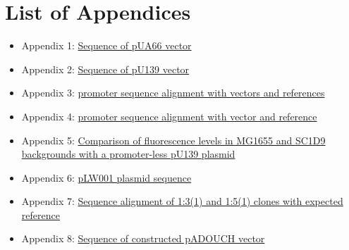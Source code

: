 \chapter*{List of Appendices}

\begin{itemize}[label={}]
\item Appendix 1: \hypertarget{pUA66seq}{\href{https://drive.google.com/open?id=1oHOr45i53oj1ZvaJO2rwhhKW336-1qDa}{Sequence of pUA66 vector}}
\item Appendix 2: \hypertarget{p139seq}{\href{https://drive.google.com/open?id=1eTZO0u8nTtbIphnsHlNvB4G_L2-LnJ-f}{Sequence of pU139 vector}}
\item Appendix 3: \hypertarget{placZalign}{\href{https://drive.google.com/open?id=1uxseqbHVccpsxmKUuVl5_nBY2wEvpF8J}{ promoter sequence alignment with vectors and references}}
\item Appendix 4: \hypertarget{precAalign}{\href{https://drive.google.com/open?id=1g5AUZ4vEhNVGWuKy9A7augQ2beI5EW9o}{ promoter sequence alignment with vector and reference}}
\item Appendix 5: \hypertarget{FCnegs}{\href{https://drive.google.com/open?id=1M2mKz7TUkuwOr1n_dIoUlk9kRn0nOF99}{Comparison of fluorescence levels in MG1655 and SC1\textunderscore D9 backgrounds with a promoter-less pU139 plasmid}}
\item Appendix 6: \hypertarget{pLW001}{\href{https://drive.google.com/open?id=1HhTVjaBZxkOQPb05qaPJYQk1XmyXM7zO}{pLW001 plasmid sequence}}
\item Appendix 7: \hypertarget{pADOUCHseq}{\href{https://drive.google.com/open?id=1RT7LigW9waKPSw4mTKGJVCJavP3P0kWW}{Sequence alignment of 1:3(1) and 1:5(1) clones with expected reference}}
\item Appendix 8: \hypertarget{pADOUCHwhole}{\href{https://drive.google.com/open?id=1kS7Ih-cgBlwvxuMc4spGqSF4MdvcVV9f}{Sequence of constructed pADOUCH vector}}
\end{itemize}



